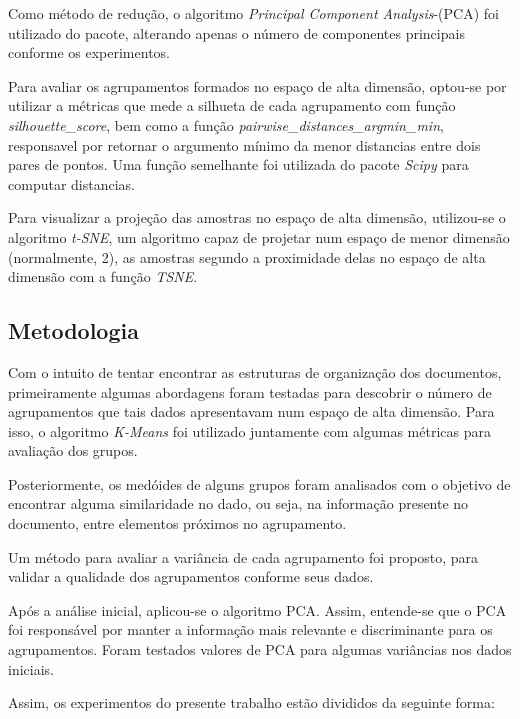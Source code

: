 \documentclass[conference]{IEEEtran}
\begin{document}
Como método de redução, o algoritmo \emph{Principal Component Analysis}-(PCA) foi utilizado do pacote, alterando apenas o número de componentes principais conforme os experimentos.

Para avaliar os agrupamentos formados no espaço de alta dimensão, optou-se por utilizar a métricas que mede a silhueta de cada agrupamento com função \emph{silhouette\_score}, bem como a função \emph{pairwise\_distances\_argmin\_min}, responsavel por retornar o argumento mínimo da menor distancias entre dois pares de pontos. Uma função semelhante foi utilizada do pacote \emph{Scipy} para computar distancias.

Para visualizar a projeção das amostras no espaço de alta dimensão, utilizou-se o algoritmo \emph{t-SNE}, um algoritmo capaz de projetar num espaço de menor dimensão (normalmente, 2), as amostras segundo a proximidade delas no espaço de alta dimensão com a função \emph{TSNE}.


\subsection{Metodologia} \label{sec:met} 

Com o intuito de tentar encontrar as estruturas de organização dos documentos, primeiramente algumas abordagens foram testadas para descobrir o número de agrupamentos que tais dados apresentavam num espaço de alta dimensão. Para isso, o algoritmo \emph{K-Means} foi utilizado juntamente com algumas métricas para avaliação dos grupos.

Posteriormente, os medóides de alguns grupos foram analisados com o objetivo de encontrar alguma similaridade no dado, ou seja, na informação presente no documento, entre elementos próximos no agrupamento.

Um método para avaliar a variância de cada agrupamento foi proposto, para validar a qualidade dos agrupamentos conforme seus dados.

Após a análise inicial, aplicou-se o algoritmo PCA. Assim, entende-se que o PCA foi responsável por manter a informação mais relevante e discriminante para os agrupamentos. Foram testados valores de PCA para algumas variâncias nos dados iniciais.

Assim, os experimentos do presente trabalho estão divididos da seguinte forma: 
\end{document}
